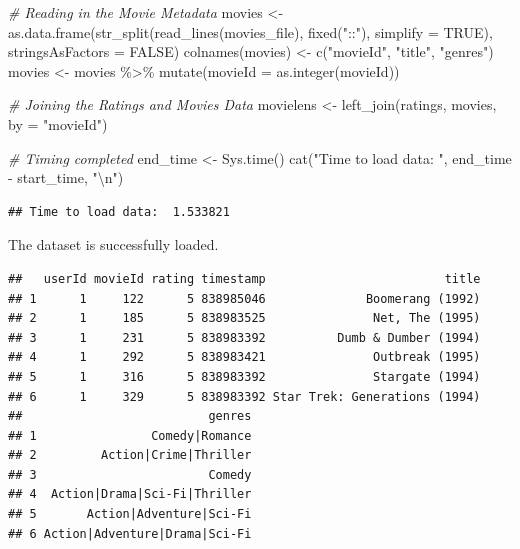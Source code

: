 \documentclass[
]{article}
\newenvironment{Shaded}{}{}
\newcommand{\AttributeTok}[1]{\textcolor[rgb]{0.49,0.56,0.16}{#1}}
\newcommand{\CommentTok}[1]{\textcolor[rgb]{0.38,0.63,0.69}{\textit{#1}}}
\newcommand{\ConstantTok}[1]{\textcolor[rgb]{0.53,0.00,0.00}{#1}}
\newcommand{\FunctionTok}[1]{\textcolor[rgb]{0.02,0.16,0.49}{#1}}
\newcommand{\NormalTok}[1]{#1}
\newcommand{\OtherTok}[1]{\textcolor[rgb]{0.00,0.44,0.13}{#1}}
\newcommand{\SpecialCharTok}[1]{\textcolor[rgb]{0.25,0.44,0.63}{#1}}
\newcommand{\StringTok}[1]{\textcolor[rgb]{0.25,0.44,0.63}{#1}}
\begin{document}
\begin{Shaded}
\begin{Highlighting}[]
\CommentTok{\# Reading in the Movie Metadata}
\NormalTok{movies }\OtherTok{\textless{}{-}} \FunctionTok{as.data.frame}\NormalTok{(}\FunctionTok{str\_split}\NormalTok{(}\FunctionTok{read\_lines}\NormalTok{(movies\_file), }
                                  \FunctionTok{fixed}\NormalTok{(}\StringTok{"::"}\NormalTok{), }
                                  \AttributeTok{simplify =} \ConstantTok{TRUE}\NormalTok{),}
                        \AttributeTok{stringsAsFactors =} \ConstantTok{FALSE}\NormalTok{)}
\FunctionTok{colnames}\NormalTok{(movies) }\OtherTok{\textless{}{-}} \FunctionTok{c}\NormalTok{(}\StringTok{"movieId"}\NormalTok{, }\StringTok{"title"}\NormalTok{, }\StringTok{"genres"}\NormalTok{)}
\NormalTok{movies }\OtherTok{\textless{}{-}}\NormalTok{ movies }\SpecialCharTok{\%\textgreater{}\%} \FunctionTok{mutate}\NormalTok{(}\AttributeTok{movieId =} \FunctionTok{as.integer}\NormalTok{(movieId))}

\CommentTok{\# Joining the Ratings and Movies Data}
\NormalTok{movielens }\OtherTok{\textless{}{-}} \FunctionTok{left\_join}\NormalTok{(ratings, movies, }\AttributeTok{by =} \StringTok{"movieId"}\NormalTok{)}

\CommentTok{\# Timing completed}
\NormalTok{end\_time }\OtherTok{\textless{}{-}} \FunctionTok{Sys.time}\NormalTok{()}
\FunctionTok{cat}\NormalTok{(}\StringTok{"Time to load data: "}\NormalTok{, end\_time }\SpecialCharTok{{-}}\NormalTok{ start\_time, }\StringTok{"}\SpecialCharTok{\textbackslash{}n}\StringTok{"}\NormalTok{)}
\end{Highlighting}
\end{Shaded}

\begin{verbatim}
## Time to load data:  1.533821
\end{verbatim}

The dataset is successfully loaded.

\begin{verbatim}
##   userId movieId rating timestamp                         title
## 1      1     122      5 838985046              Boomerang (1992)
## 2      1     185      5 838983525               Net, The (1995)
## 3      1     231      5 838983392          Dumb & Dumber (1994)
## 4      1     292      5 838983421               Outbreak (1995)
## 5      1     316      5 838983392               Stargate (1994)
## 6      1     329      5 838983392 Star Trek: Generations (1994)
##                          genres
## 1                Comedy|Romance
## 2         Action|Crime|Thriller
## 3                        Comedy
## 4  Action|Drama|Sci-Fi|Thriller
## 5       Action|Adventure|Sci-Fi
## 6 Action|Adventure|Drama|Sci-Fi
\end{verbatim}
\end{document}
